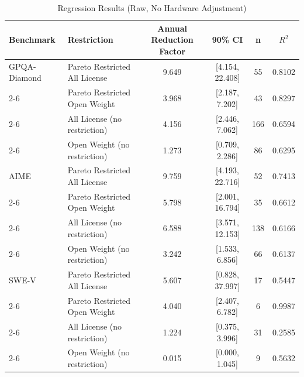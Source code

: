 \renewcommand{\arraystretch}{1.2}

\begin{table}[t]
\centering
\caption{Regression Results (Raw, No Hardware Adjustment)}
\label{tab:regression_results_raw}
\renewcommand{\arraystretch}{1.2}

\begin{tabular}{|l|l|c|c|c|c|}
\hline
\textbf{Benchmark} & \textbf{Restriction} & \textbf{Annual Reduction Factor} & \textbf{90\% CI} & \textbf{n} & \textbf{$R^2$} \\
\hline

GPQA-Diamond & Pareto Restricted All License & 9.649 & [4.154, 22.408] & 55 & 0.8102 \\ \cline{2-6}
\rowcolor{restrgray} \cellcolor{white} & Pareto Restricted Open Weight & 3.968 & [2.187, 7.202] & 43 & 0.8297 \\ \cline{2-6}
\cellcolor{white} & All License (no restriction) & 4.156 & [2.446, 7.062] & 166 & 0.6594 \\ \cline{2-6}
\rowcolor{restrgray} \cellcolor{white} & Open Weight (no restriction) & 1.273 & [0.709, 2.286] & 86 & 0.6295 \\
\hline

AIME & Pareto Restricted All License & 9.759 & [4.193, 22.716] & 52 & 0.7413 \\ \cline{2-6}
\rowcolor{restrgray} \cellcolor{white} & Pareto Restricted Open Weight & 5.798 & [2.001, 16.794] & 35 & 0.6612 \\ \cline{2-6}
\cellcolor{white} & All License (no restriction) & 6.588 & [3.571, 12.153] & 138 & 0.6166 \\ \cline{2-6}
\rowcolor{restrgray} \cellcolor{white} & Open Weight (no restriction) & 3.242 & [1.533, 6.856] & 66 & 0.6137 \\
\hline

SWE\mbox{-}V & Pareto Restricted All License & 5.607 & [0.828, 37.997] & 17 & 0.5447 \\ \cline{2-6}
\rowcolor{restrgray} \cellcolor{white} & Pareto Restricted Open Weight & 4.040 & [2.407, 6.782] & 6 & 0.9987 \\ \cline{2-6}
\cellcolor{white} & All License (no restriction) & 1.224 & [0.375, 3.996] & 31 & 0.2585 \\ \cline{2-6}
\rowcolor{restrgray} \cellcolor{white} & Open Weight (no restriction) & 0.015 & [0.000, 1.045] & 9 & 0.5632 \\
\hline

\end{tabular}
\end{table}
